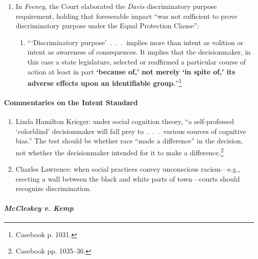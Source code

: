 \begin{enumerate}
    \item In \emph{Feeney}, the Court elaborated the \emph{Davis} 
    discriminatory purpose requirement, holding that foreseeable impact ``was 
    not sufficient to prove discriminatory purpose under the Equal Protection 
    Clause'':
    \begin{enumerate}
        \item \enquote{\enquote{Discriminatory purpose}~.~.~.~implies more 
        than intent as volition or intent as awareness of consequences. It 
        implies that the decisionmaker, in this case a state legislature, 
        selected or reaffirmed a particular course of action at least in part 
        \textbf{`because of,' not merely `in spite of,' its adverse effects 
        upon an identifiable group.}}\footnote{Casebook p. 1031.}
    \end{enumerate}
\end{enumerate}

\paragraph{Commentaries on the Intent Standard}

\begin{enumerate}
    \item Linda Hamilton Krieger: under social cognition theory, ``a 
    self-professed `colorblind' decisionmaker will fall prey to~.~.~.~various 
    sources of cognitive bias.'' The test should be whether race ``made a 
    difference'' in the decision, not whether the decisionmaker intended for 
    it to make a difference.\footnote{Casebook pp. 1035--36.}
    \item Charles Lawrence: when social practices convey unconscious 
    racism---e.g., erecting a wall between the black and white parts of 
    town---courts should recognize discrimination.
\end{enumerate}

\paragraph{\emph{McCleskey v. Kemp}}

